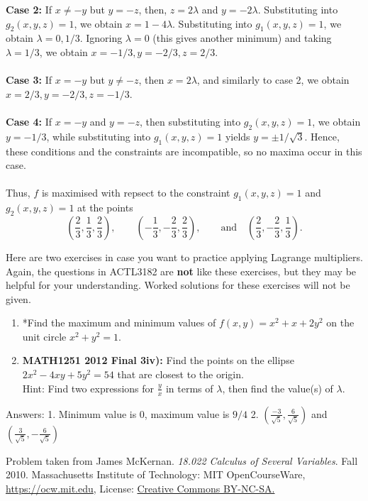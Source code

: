 \documentclass[11pt]{article}
\begin{document}
 	\textbf{Case 2:} If \( x \neq -y \) but \( y = -z \), then, \( z = 2\lambda \) and \( y = -2\lambda \). Substituting into \( g_2(x,y,z) = 1 \), we obtain \( x = 1 - 4\lambda \). Substituting into \( g_{1}(x,y,z) = 1 \), we obtain \( \lambda = 0, 1/3 \). Ignoring \( \lambda = 0 \) (this gives another minimum) and taking \( \lambda = 1/3 \), we obtain \( x = -1/3, y = -2/3, z = 2/3 \).\\\\
 	\textbf{Case 3:} If \( x = -y \) but \( y\neq - z \), then \( x = 2\lambda \), and similarly to case 2, we obtain \( x = 2/3, y = -2/3, z = -1/3 \). \\\\
 	\textbf{Case 4:} If \( x = -y \) and \( y = -z \), then substituting into \( g_{2}(x,y,z)  =1 \), we obtain \( y = -1/3 \), while substituting into \( g_{1}(x,y,z) = 1 \) yields \( y = \pm 1/\sqrt{3} \). Hence, these conditions and the constraints are incompatible, so no maxima occur in this case.\\\\
 	Thus, \( f \) is maximised with repsect to the constraint \( g_1(x,y,z) = 1 \) and \( g_{2}(x,y,z) = 1 \) at the points 
 	\[	\left(\frac{2}{3}, \frac{1}{3}, \frac{2}{3}\right),\qquad \left(-\frac{1}{3}, -\frac{2}{3}, \frac{2}{3}\right), \qquad\text{and}\quad\left(\frac{2}{3}, -\frac{2}{3}, \frac{1}{3}\right).
 	\]
 	
 	\noindent Here are two exercises in case you want to practice applying Lagrange multipliers. Again, the questions in ACTL3182 are \textbf{not} like these exercises, but they may be helpful for your understanding. Worked solutions for these exercises will not be given.\\ 
 	\begin{exercise}
 		\begin{enumerate}
 			\item *Find the maximum and minimum values of \( f(x,y) = x^2 + x + 2y^2 \) on the unit circle \( x^2 + y^2 = 1 \).
 			\item \textbf{MATH1251 2012 Final 3iv):} Find the points on the ellipse \( 2x^2 - 4xy + 5y^2 = 54 \) that are closest to the origin. \\[3pt]Hint: Find two expressions for \( \frac{y}{x} \) in terms of \( \lambda \), then find the value(s) of \( \lambda \).
 		\end{enumerate}
 		\tcblower
 		Answers: 1. Minimum value is 0, maximum value is \( 9/4 \) \hspace{1cm} 2. \( \left(\frac{-3}{\sqrt{5}}, \frac{6}{\sqrt{5}}\right) \) and \(\left(\frac{3}{\sqrt{5}}, -\frac{6}{\sqrt{5}}\right)   \)
  	\end{exercise}
  	\bigskip
  	\noindent *Problem taken from James McKernan. \textit{18.022 Calculus of Several Variables}. Fall 2010. Massachusetts Institute of Technology: MIT OpenCourseWare, \href{https://ocw.mit.edu/courses/mathematics/18-022-calculus-of-several-variables-fall-2010}{https://ocw.mit.edu}, License: \href{https://creativecommons.org/licenses/by-nc-sa/4.0/}{Creative Commons BY-NC-SA.}
  	
	
\end{document}
